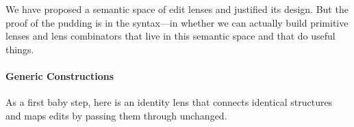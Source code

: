 \label{sec:combinators}

\iflater{}\fi

\iflater
{}
\fi

We have proposed a semantic space of edit lenses and justified its design.
But the proof of the pudding is in the syntax---in whether we can actually
build primitive lenses and lens combinators that live in this semantic space
and that do useful things.

\paragraph*{Generic Constructions}

As a first baby step, here is an identity lens that connects identical
structures and maps edits by passing them through unchanged.

